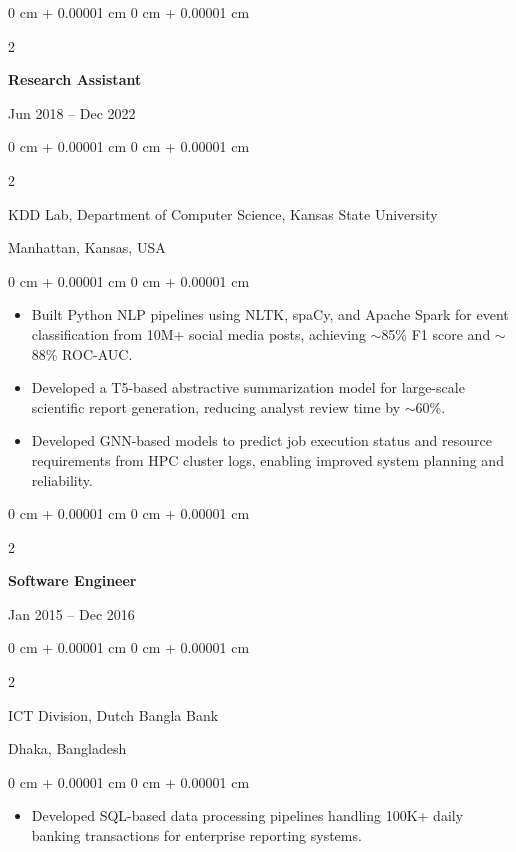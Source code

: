 \documentclass[10pt, letterpaper]{article}
\newenvironment{highlights}{
    \begin{itemize}[
        topsep=0.10 cm,
        parsep=0.10 cm,
        partopsep=0pt,
        itemsep=0pt,
        leftmargin=0 cm + 10pt
    ]
}{
    \end{itemize}
} %
\newenvironment{onecolentry}{
    \begin{adjustwidth}{
        0 cm + 0.00001 cm
    }{
        0 cm + 0.00001 cm
    }
}{
    \end{adjustwidth}
} %
\newenvironment{twocolentry}[2][]{
    \onecolentry
    \def\secondColumn{#2}
    \setcolumnwidth{\fill, 4.5 cm}
    \begin{paracol}{2}
}{
    \switchcolumn \raggedleft \secondColumn
    \end{paracol}
    \endonecolentry
} %
\let\hrefWithoutArrow\href
\begin{document}
    \vspace{1mm}

    \begin{twocolentry}{Jun 2018 -- Dec 2022}
        \textbf{Research Assistant}
    \end{twocolentry}
    \begin{twocolentry}{Manhattan, Kansas, USA}
       KDD Lab, Department of Computer Science, Kansas State University
    \end{twocolentry}
    \vspace{0.10 cm}
    \begin{onecolentry}
        \begin{highlights}
            \item Built Python NLP pipelines using NLTK, spaCy, and Apache Spark for event classification from 10M+ social media posts, achieving $\sim$85\% F1 score and $\sim$88\% ROC-AUC.
            \item Developed a T5-based abstractive summarization model for large-scale scientific report generation, reducing analyst review time by $\sim$60\%.
            \item Developed GNN-based models to predict job execution status and resource requirements from HPC cluster logs, enabling improved system planning and reliability.
        \end{highlights}
    \end{onecolentry}

    \vspace{0.1 cm}
    \begin{twocolentry}{Jan 2015 -- Dec 2016}
        \textbf{Software Engineer}
    \end{twocolentry}
    \begin{twocolentry}{Dhaka, Bangladesh}
       ICT Division, Dutch Bangla Bank
    \end{twocolentry}

    \begin{onecolentry}
        \begin{highlights}
            \item Developed SQL-based data processing pipelines handling 100K+ daily banking transactions for enterprise reporting systems.
        \end{highlights}
    \end{onecolentry}

    \vspace{-1mm}
\end{document}
